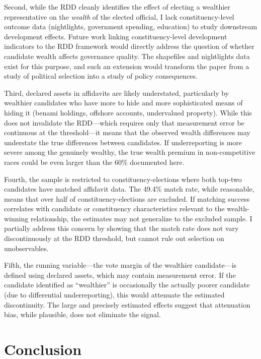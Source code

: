 \documentclass[12pt]{article}
\begin{document}
Second, while the RDD cleanly identifies the effect of electing a wealthier representative on the \textit{wealth} of the elected official, I lack constituency-level outcome data (nightlights, government spending, education) to study downstream development effects. Future work linking constituency-level development indicators to the RDD framework would directly address the question of whether candidate wealth affects governance quality. The shapefiles and nightlights data exist for this purpose, and such an extension would transform the paper from a study of political selection into a study of policy consequences.

Third, declared assets in affidavits are likely understated, particularly by wealthier candidates who have more to hide and more sophisticated means of hiding it (benami holdings, offshore accounts, undervalued property). While this does not invalidate the RDD---which requires only that measurement error be continuous at the threshold---it means that the observed wealth differences may understate the true differences between candidates. If underreporting is more severe among the genuinely wealthy, the true wealth premium in non-competitive races could be even larger than the 60\% documented here.

Fourth, the sample is restricted to constituency-elections where both top-two candidates have matched affidavit data. The 49.4\% match rate, while reasonable, means that over half of constituency-elections are excluded. If matching success correlates with candidate or constituency characteristics relevant to the wealth-winning relationship, the estimates may not generalize to the excluded sample. I partially address this concern by showing that the match rate does not vary discontinuously at the RDD threshold, but cannot rule out selection on unobservables.

Fifth, the running variable---the vote margin of the wealthier candidate---is defined using declared assets, which may contain measurement error. If the candidate identified as ``wealthier'' is occasionally the actually poorer candidate (due to differential underreporting), this would attenuate the estimated discontinuity. The large and precisely estimated effects suggest that attenuation bias, while plausible, does not eliminate the signal.


\section{Conclusion}
\end{document}
